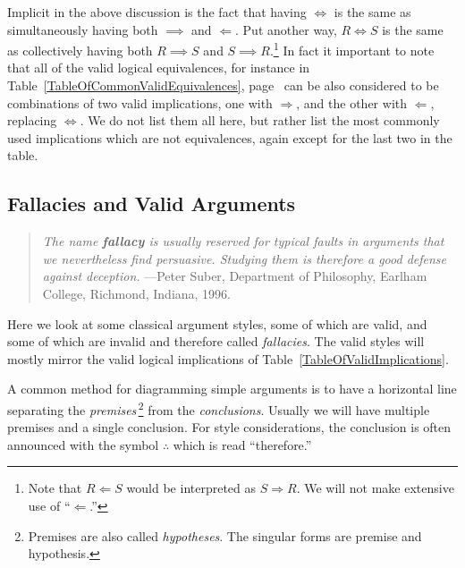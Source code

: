 Implicit in the above discussion is the fact that
having $\iff$ is the same as simultaneously having 
both $\implies$ and $\Longleftarrow$.  Put another
way, $R\iff S$ is the same as 
collectively having both $R\implies S$ and $S\implies R$.\footnote{%
Note that $R\Longleftarrow S$ would be interpreted as
$S\Longrightarrow R$.  We will not make extensive
use of ``$\Longleftarrow$.''%
}
In fact it important to note that all of the valid
logical equivalences, for 
instance in Table~\ref{TableOfCommonValidEquivalences},
page~\pageref{TableOfCommonValidEquivalences} can be
also considered to be combinations of two valid implications,
one with $\Longrightarrow$, and the other with $\Longleftarrow$,
replacing $\Longleftrightarrow$.  We do not list them all here,
but rather list the most commonly used implications which are
not equivalences, again except for the last two in
the table.


\subsection[Fallacies and Valid Arguments]%
{Fallacies and Valid Arguments\footnotemark}

\begin{quote}
{\it The name {\bf fallacy} is usually reserved for {\rm typical} 
faults in arguments 
that we nevertheless find persuasive. Studying them is therefore a 
good defense against deception.}
\newline
---Peter Suber, Department of Philosophy, Earlham College, 
Richmond, Indiana, 1996.
\end{quote}


Here we look at some classical argument styles, some of which
are valid, and some of which are invalid and therefore called 
{\it fallacies}.  The valid styles will mostly mirror the valid 
logical implications of Table~\ref{TableOfValidImplications}.


A common  method for diagramming simple arguments is to have a
horizontal line separating the {\it premises}\,\footnote{%
Premises are also called {\it hypotheses}.  The singular forms
are premise and hypothesis.%
} from the {\it conclusions}.  Usually we will have multiple premises and
a single conclusion.  For style considerations,
the conclusion is often announced with the
symbol $\therefore$ which is read ``therefore.''   

